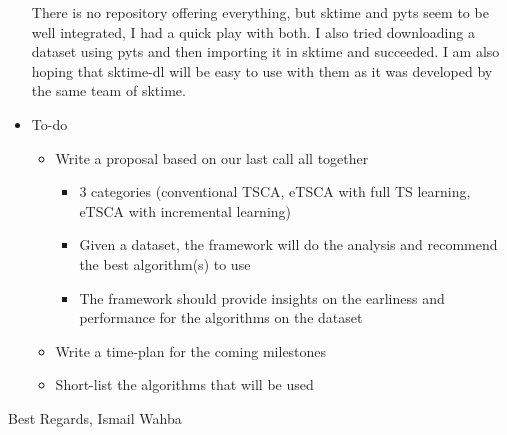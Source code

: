 \documentclass{article}
\begin{document}
\begin{itemize}
\begin{itemize}
\begin{itemize}
\begin{itemize}
						\end{itemize}
				\end{itemize}
		\end{itemize}
		There is no repository offering everything, but sktime and pyts seem to be well integrated, I had a quick play with both. I also tried downloading a dataset using pyts and then importing it in sktime and succeeded.\newline
		I am also hoping that sktime-dl will be easy to use with them as it was developed by the same team of sktime.\newline
	\item To-do
		\begin{itemize}
			\item Write a proposal based on our last call all together
				\begin{itemize}
					\item 3 categories (conventional TSCA, eTSCA with full TS learning, eTSCA with incremental learning)
					\item Given a dataset, the framework will do the analysis and recommend the best algorithm(s) to use
					\item The framework should provide insights on the earliness and performance for the algorithms on the dataset
				\end{itemize}
			\item Write a time-plan for the coming milestones
			\item Short-list the algorithms that will be used
		\end{itemize}
\end{itemize}

Best Regards,
Ismail Wahba
\end{document}
